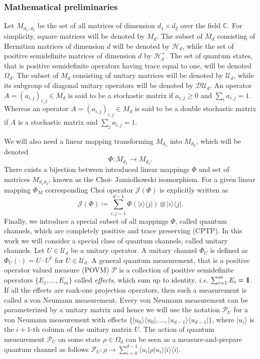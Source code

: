 \documentclass[preprint,12pt, a4paper]{elsarticle}
\newcommand{\ie}{{\emph{i.e.\/}}}
\newcommand{\ket}[1]{\ensuremath{|#1\rangle}}
\newcommand{\bra}[1]{\ensuremath{\langle#1|}}
\newcommand{\ketbra}[2]{\ensuremath{\ket{#1}\bra{#2}}}
\newcommand{\proj}[1]{\ensuremath{\ketbra{#1}{#1}}}
\newcommand{\1}{{\rm 1\hspace{-0.9mm}l}}
\newcommand{\DD}{\mathcal{D}}
\newcommand{\PP}{\mathcal{P}}
\newcommand{\UU}{\mathcal{U}}
\newcommand{\HH}{\mathcal{H}}
\begin{document}
\subsubsection{Mathematical preliminaries}



Let $M_{d_1,d_2}$ be the set of all matrices of dimension $d_1 \times d_2$ over
the field $\mathbb{C}$. For  simplicity, square matrices will be denoted by
$M_d$.  The subset of $M_d$ consisting of Hermitian matrices of dimension $d$
will  be  denoted  by $\HH_d$,  while  the  set  of  positive semidefinite
matrices of dimension $d$ by $\HH_d^+$. The set of quantum states, that is
positive semidefinite operators having trace equal to one, will be denoted
$\Omega_d$. 
 The subset of $M_d$ consisting of unitary matrices will be denoted
by $\UU_d$, while its subgroup of diagonal unitary operators will be denoted by
$\DD \UU_d$. 
	An operator $A = \left( a_{i,j}\right)_{i,j} \in M_d$ is said to be a stochastic matrix if $a_{i,j} \ge 0$   and $\sum_{i} a_{i,j} = 1$.
Whereas an operator $A = \left( a_{i,j}\right)_{i,j} \in M_d$ is said to be a double stochastic matrix if $A$ is a stochastic matrix and $\sum_{j} a_{i,j} = 1$.


 We will also need a linear mapping transforming $M_{d_1}$ into
$M_{d_2}$, which will be denoted 
\begin{equation}
\Phi: M_{d_1 } \rightarrow M_{d_2}.
\end{equation} 
There
exists a bijection between introduced linear mappings $\Phi$ and set of matrices $M_{d_1d_2}$,  known as the Choi-
Jamio{\l}kowski isomorphism. 
For a given linear mapping $\Phi_M$ corresponding  Choi operator $\mathcal{J}(\Phi)$ is explicitly written as 
\begin{equation}
\mathcal{J}(\Phi) \coloneqq \sum_{i,j=1}^{d- 1} \Phi(\ketbra{i}{j}) \otimes \ketbra{i}{j}. \end{equation}
Finally, we introduce a special subset of all mappings $\Phi$, called quantum channels, which are completely positive
and trace preserving (CPTP).
In this work we will consider a special class of quantum channels, called unitary channels. Let $U \in \UU_d$ be a unitary operator. A unitary channel
$\Phi_{U}$ is defined as $\Phi_U(\cdot) = U \cdot U^\dagger$ for  $U \in 
\UU_d$. A general quantum
measurement, that is a positive operator valued measure (POVM) $\PP$ is a
collection of positive semidefinite operators $\{E_1, \ldots, E_m \}$ called
\emph{effects}, which sum up to identity, \ie $ \, \, \sum_{i=1}^m E_i = \1$. If
all the effects are rank-one projection operators, then such a measurement is
called a von Neumann measurement. Every von Neumann measurement can be
parameterized by a unitary matrix and hence we will use the notation $\PP_{U}$
for a von Neumann measurement with effects $\{\proj{u_0}, \ldots, \proj{u_{d-1}}\}$,
where $\ket{u_i}$ is the $i+1$-th column of the unitary matrix $U$. The action of
quantum measurement $\PP_{U}$ on some state $\rho \in \Omega_d$ can be
seen as  a measure-and-prepare quantum channel as follows 
$
\PP_{U} : \rho \rightarrow \sum_{i=0}^{d-1} \bra{u_i} \rho \ket{u_i} \proj{i}.
$ 
\end{document}
